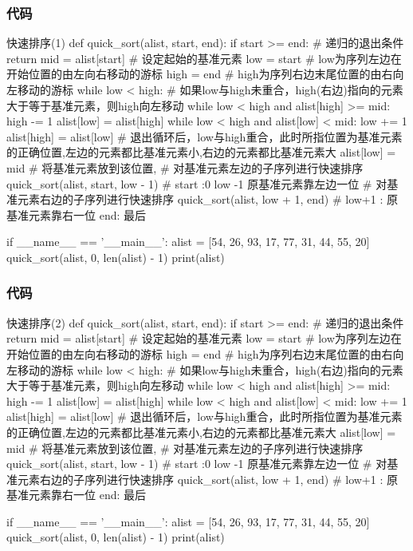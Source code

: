 \begin{frame}[fragile]
    \frametitle{代码}
    \begin{codeblock}[firstline=1, lastline =14]{快速排序(1)}
def quick_sort(alist, start, end):
    if start >= end:  # 递归的退出条件
        return
    mid = alist[start]  # 设定起始的基准元素
    low = start  # low为序列左边在开始位置的由左向右移动的游标
    high = end  # high为序列右边末尾位置的由右向左移动的游标
    while low < high:
        # 如果low与high未重合，high(右边)指向的元素大于等于基准元素，则high向左移动
        while low < high and alist[high] >= mid:
            high -= 1
        alist[low] = alist[high]  
        while low < high and alist[low] < mid:
            low += 1
        alist[high] = alist[low] 
    # 退出循环后，low与high重合，此时所指位置为基准元素的正确位置,左边的元素都比基准元素小,右边的元素都比基准元素大
    alist[low] = mid  # 将基准元素放到该位置,
    # 对基准元素左边的子序列进行快速排序
    quick_sort(alist, start, low - 1)  # start :0  low -1 原基准元素靠左边一位
    # 对基准元素右边的子序列进行快速排序
    quick_sort(alist, low + 1, end)  # low+1 : 原基准元素靠右一位  end: 最后

    
    if __name__ == '__main__':
        alist = [54, 26, 93, 17, 77, 31, 44, 55, 20]
        quick_sort(alist, 0, len(alist) - 1)
        print(alist)
    \end{codeblock}
    \vspace{-2pt}
\end{frame}


\begin{frame}[fragile]
    \frametitle{代码}
    \begin{codeblock}[firstline=15, lastline =30, firstnumber=15]{快速排序(2)}
def quick_sort(alist, start, end):
    if start >= end:  # 递归的退出条件
        return
    mid = alist[start]  # 设定起始的基准元素
    low = start  # low为序列左边在开始位置的由左向右移动的游标
    high = end  # high为序列右边末尾位置的由右向左移动的游标
    while low < high:
        # 如果low与high未重合，high(右边)指向的元素大于等于基准元素，则high向左移动
        while low < high and alist[high] >= mid:
            high -= 1
        alist[low] = alist[high]  
        while low < high and alist[low] < mid:
            low += 1
        alist[high] = alist[low] 
    # 退出循环后，low与high重合，此时所指位置为基准元素的正确位置,左边的元素都比基准元素小,右边的元素都比基准元素大
    alist[low] = mid  # 将基准元素放到该位置,
    # 对基准元素左边的子序列进行快速排序
    quick_sort(alist, start, low - 1)  # start :0  low -1 原基准元素靠左边一位
    # 对基准元素右边的子序列进行快速排序
    quick_sort(alist, low + 1, end)  # low+1 : 原基准元素靠右一位  end: 最后

    
if __name__ == '__main__':
    alist = [54, 26, 93, 17, 77, 31, 44, 55, 20]
    quick_sort(alist, 0, len(alist) - 1)
    print(alist)
    \end{codeblock}
\end{frame}


